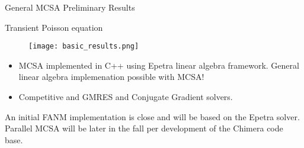 \documentclass{beamer}
\begin{document}
\begin{frame}{General MCSA Preliminary Results}

  Transient Poisson equation

  \begin{figure}[htpb!]
    \begin{center}
      \texttt{[image: basic\_results.png]}
    \end{center}
  \end{figure}
  
  \begin{itemize}
  \item MCSA implemented in C++ using Epetra linear algebra
    framework. General linear algebra implemenation possible with
    MCSA!
  \item Competitive and GMRES and Conjugate Gradient solvers.
  \end{itemize}

  An initial FANM implementation is close and will be based on the
  Epetra solver. Parallel MCSA will be later in the fall per
  development of the Chimera code base.

\end{frame}

\end{document}
